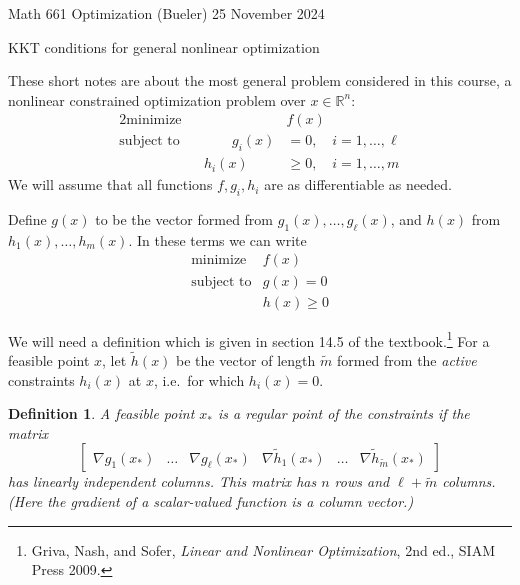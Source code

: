 \documentclass[11pt]{amsart}
\newtheorem*{defn}{Definition}
\theoremstyle{definition}
\newcommand{\RR}{\mathbb{R}}
\newcommand{\grad}{\nabla}
\begin{document}
\scriptsize \noindent Math 661 Optimization (Bueler) \hfill 25 November 2024
\normalsize

\medskip\bigskip
\Large
\centerline{KKT conditions for general nonlinear optimization}

\bigskip\medskip
\normalsize

\thispagestyle{empty}

These short notes are about the most general problem considered in this course, a nonlinear constrained optimization problem over $x\in\RR^n$:
\begin{alignat*}{2}
    \text{minimize}   &&  &f(x) \\
    \text{subject to} && \qquad g_i(x) &= 0, \quad i=1,\dots,\ell \\
                      &&       h_i(x) &\ge 0, \quad i=1,\dots,m
\end{alignat*}
We will assume that all functions $f,g_i,h_i$ are as differentiable as needed.

Define $g(x)$ to be the vector formed from $g_1(x),\dots,g_\ell(x)$, and $h(x)$ from $h_1(x),\dots,h_m(x)$.  In these terms we can write
\begin{equation}
\begin{matrix}
    \text{minimize}   & f(x) \\
    \text{subject to} & g(x) = 0 \\
                      & h(x) \ge 0
\end{matrix} \label{prob}
\end{equation}

We will need a definition which is given in section 14.5 of the textbook.\footnote{Griva, Nash, and Sofer, \emph{Linear and Nonlinear Optimization}, 2nd ed., SIAM Press 2009.}  For a feasible point $x$, let $\tilde h(x)$ be the vector of length $\tilde m$ formed from the \emph{active} constraints $h_i(x)$ at $x$, i.e.~for which $h_i(x)=0$.

\begin{defn}  A feasible point $x_*$ is a \emph{regular point} of the constraints if the matrix
    $$\begin{bmatrix}
    \grad g_1(x_*) & \dots & \grad g_\ell(x_*) & \grad {\tilde h}_1(x_*) & \dots & \grad {\tilde h}_{\tilde m}(x_*)
    \end{bmatrix}$$
has linearly independent columns.  This matrix has $n$ rows and $\ell + \tilde m$ columns.  (Here the gradient of a scalar-valued function is a column vector.)
\end{defn}
\end{document}
